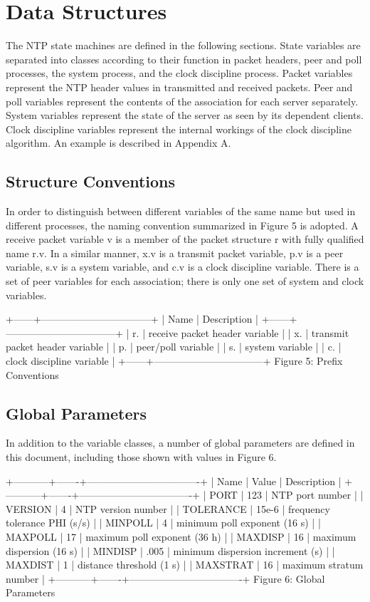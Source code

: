 \chapter{Data Structures}

The NTP state machines are defined in the following sections. State
variables are separated into classes according to their function in
packet headers, peer and poll processes, the system process, and the
clock discipline process. Packet variables represent the NTP header
values in transmitted and received packets. Peer and poll variables
represent the contents of the association for each server separately.
System variables represent the state of the server as seen by its
dependent clients. Clock discipline variables represent the internal
workings of the clock discipline algorithm. An example is described
in Appendix A.

\section{Structure Conventions}

In order to distinguish between different variables of the same name
but used in different processes, the naming convention summarized in
Figure 5 is adopted. A receive packet variable v is a member of the
packet structure r with fully qualified name r.v. In a similar
manner, x.v is a transmit packet variable, p.v is a peer variable,
s.v is a system variable, and c.v is a clock discipline variable.
There is a set of peer variables for each association; there is only
one set of system and clock variables.

+------+---------------------------------+
| Name | Description |
+------+---------------------------------+
| r. | receive packet header variable |
| x. | transmit packet header variable |
| p. | peer/poll variable |
| s. | system variable |
| c. | clock discipline variable |
+------+---------------------------------+
Figure 5: Prefix Conventions

\section{Global Parameters}

In addition to the variable classes, a number of global parameters
are defined in this document, including those shown with values in
Figure 6.

+-----------+-------+----------------------------------+
| Name | Value | Description |
+-----------+-------+----------------------------------+
| PORT | 123 | NTP port number |
| VERSION | 4 | NTP version number |
| TOLERANCE | 15e-6 | frequency tolerance PHI (s/s) |
| MINPOLL | 4 | minimum poll exponent (16 s) |
| MAXPOLL | 17 | maximum poll exponent (36 h) |
| MAXDISP | 16 | maximum dispersion (16 s) |
| MINDISP | .005 | minimum dispersion increment (s) |
| MAXDIST | 1 | distance threshold (1 s) |
| MAXSTRAT | 16 | maximum stratum number |
+-----------+-------+----------------------------------+
Figure 6: Global Parameters

